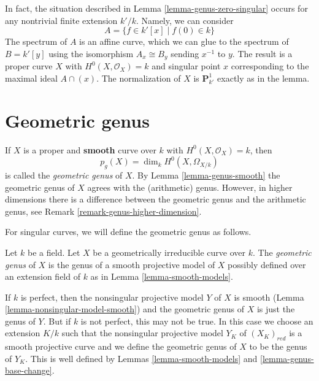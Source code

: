 \begin{example}
\label{example-squish-on-P1}
In fact, the situation described in Lemma \ref{lemma-genus-zero-singular}
occurs for any nontrivial finite extension $k'/k$. Namely, we can consider
$$
A = \{f \in k'[x] \mid f(0) \in k \}
$$
The spectrum of $A$ is an affine curve, which we can glue to
the spectrum of $B = k'[y]$ using the isomorphism
$A_x \cong B_y$ sending $x^{-1}$ to $y$.
The result is a proper curve $X$ with $H^0(X, \mathcal{O}_X) = k$
and singular point $x$ corresponding to the maximal ideal $A \cap (x)$.
The normalization of $X$ is $\mathbf{P}^1_{k'}$ exactly as in the lemma.
\end{example}








\section{Geometric genus}
\label{section-geometric-genus}

\noindent
If $X$ is a proper and {\bf smooth} curve over $k$ with
$H^0(X, \mathcal{O}_X) = k$, then
$$
p_g(X) = \dim_k H^0(X, \Omega_{X/k})
$$
is called the {\it geometric genus} of $X$. By Lemma \ref{lemma-genus-smooth}
the geometric genus of $X$ agrees with the (arithmetic) genus. However,
in higher dimensions there is a difference between the geometric genus
and the arithmetic genus, see Remark \ref{remark-genus-higher-dimension}.

\medskip\noindent
For singular curves, we will define the geometric genus as follows.

\begin{definition}
\label{definition-geometric-genus}
Let $k$ be a field. Let $X$ be a geometrically irreducible
curve over $k$. The {\it geometric genus} of $X$ is the genus
of a smooth projective model of $X$ possibly defined over
an extension field of $k$ as in
Lemma \ref{lemma-smooth-models}.
\end{definition}

\noindent
If $k$ is perfect, then the nonsingular projective model $Y$ of $X$
is smooth (Lemma \ref{lemma-nonsingular-model-smooth})
and the geometric genus of $X$ is just the genus of $Y$.
But if $k$ is not perfect, this may not be true.
In this case we choose an extension $K/k$ such that
the nonsingular projective model $Y_K$ of $(X_K)_{red}$ is
a smooth projective curve and we define the geometric genus
of $X$ to be the genus of $Y_K$. This is well defined by
Lemmas \ref{lemma-smooth-models} and \ref{lemma-genus-base-change}.

